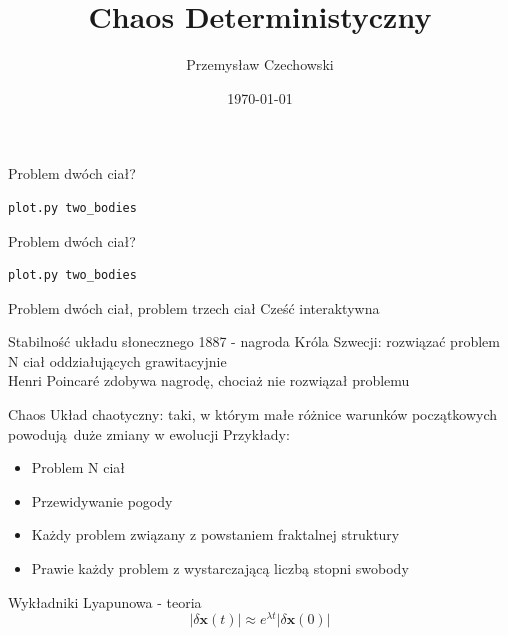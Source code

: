 \documentclass{beamer}
\begin{document}
\title{Chaos Deterministyczny} 
\author{Przemysław Czechowski} 
\date{\today} 

\frame{\titlepage} 

\begin{frame}[fragile]
Problem dwóch ciał?\pause
\begin{lstlisting}
plot.py two_bodies
\end{lstlisting}
\end{frame}

\begin{frame}[fragile]
Problem dwóch ciał?
\begin{lstlisting}
plot.py two_bodies
\end{lstlisting}
\end{frame}

\begin{frame}{Problem dwóch ciał, problem trzech ciał}
Cześć interaktywna
\end{frame}
\begin{frame}{Stabilność układu słonecznego}
1887 - nagroda Króla Szwecji: rozwiązać problem N ciał oddziałujących grawitacyjnie\pause\\
Henri Poincaré zdobywa nagrodę, chociaż nie rozwiązał problemu
\end{frame}

\begin{frame}{Chaos}
Układ chaotyczny: taki, w którym małe różnice warunków początkowych powodują duże zmiany w ewolucji\pause
Przykłady:
\begin{itemize}
\item Problem N ciał
\item Przewidywanie pogody
\item Każdy problem związany z powstaniem fraktalnej struktury
\item Prawie każdy problem z wystarczającą liczbą stopni swobody
\end{itemize} 
\end{frame}

\begin{frame}{Wykładniki Lyapunowa - teoria}
\begin{equation}
| \delta\mathbf{x}(t) | \approx e^{\lambda t} | \delta \mathbf{x}(0) |
\end{equation}\pause
\end{frame}
\end{document}
